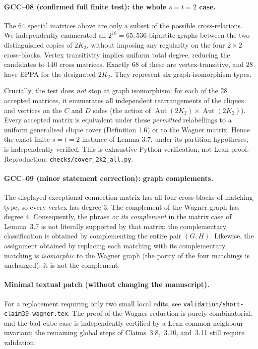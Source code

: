 \documentclass[11pt,a4paper]{article}
\begin{document}
\paragraph{GCC--08 (confirmed full finite test): the whole \(s=t=2\) case.}
The 64 special matrices above are only a subset of the possible
cross-relations. We independently enumerated all \(2^{16}=65{,}536\)
bipartite graphs between the two distinguished copies of \(2K_2\),
without imposing any regularity on the four \(2\times2\) cross-blocks.
Vertex transitivity implies uniform total degree, reducing the
candidates to 140 cross matrices. Exactly 68 of these are
vertex-transitive, and 28 have EPPA for the designated \(2K_2\).
They represent six graph-isomorphism types.

Crucially, the test does \emph{not} stop at graph isomorphism:
for each of the 28 accepted matrices, it enumerates all
independent rearrangements of the cliques and vertices
on the \(C\) and \(D\) sides (the action of
\(\operatorname{Aut}(2K_2)\times\operatorname{Aut}(2K_2)\)).
Every accepted matrix is equivalent under these \emph{permitted}
relabellings to a uniform generalised clique cover
(Definition 1.6) or to the Wagner matrix. Hence the exact
finite \(s=t=2\) instance of Lemma 3.7, under its partition
hypotheses, is independently verified. This is exhaustive
Python verification, not Lean proof.
Reproduction: \texttt{checks/cover\_2k2\_all.py}.

\paragraph{GCC--09 (minor statement correction): graph complements.}
The displayed exceptional connection matrix has all four
cross-blocks of matching type, so every vertex has degree \(3\).
The complement of the Wagner graph has degree \(4\).
Consequently, the phrase \emph{or its complement} in the matrix
case of Lemma~3.7 is not literally supported by that matrix:
the complementary classification is obtained by complementing
the entire pair \((G,H)\). Likewise, the assignment obtained
by replacing each matching with its complementary matching
is \emph{isomorphic} to the Wagner graph (the parity of the
four matchings is unchanged); it is not the complement.

\paragraph{Minimal textual patch (without changing the manuscript).}
For a replacement requiring only two small local edits, see
\texttt{validation/short-claim39-wagner.tex}.
The proof of the Wagner reduction is purely combinatorial,
and the bad cube case is independently certified by a Lean
common-neighbour invariant; the remaining global steps of
Claims~3.8,~3.10, and~3.11 still require validation.
\end{document}
